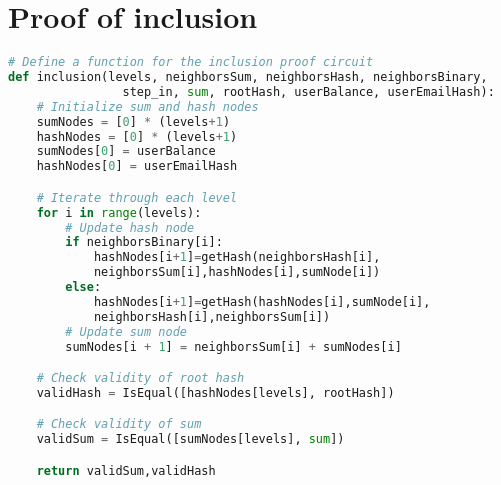 \section{Proof of inclusion}
\label{subsec:pic}
\begin{lstlisting}[language=Python, caption=Inclusion circuit pseudocode]
# Define a function for the inclusion proof circuit
def inclusion(levels, neighborsSum, neighborsHash, neighborsBinary, 
                step_in, sum, rootHash, userBalance, userEmailHash):
    # Initialize sum and hash nodes
    sumNodes = [0] * (levels+1)
    hashNodes = [0] * (levels+1)
    sumNodes[0] = userBalance
    hashNodes[0] = userEmailHash

    # Iterate through each level
    for i in range(levels):
        # Update hash node
        if neighborsBinary[i]:
            hashNodes[i+1]=getHash(neighborsHash[i],
            neighborsSum[i],hashNodes[i],sumNode[i])
        else:
            hashNodes[i+1]=getHash(hashNodes[i],sumNode[i],
            neighborsHash[i],neighborsSum[i])
        # Update sum node
        sumNodes[i + 1] = neighborsSum[i] + sumNodes[i]

    # Check validity of root hash
    validHash = IsEqual([hashNodes[levels], rootHash])

    # Check validity of sum
    validSum = IsEqual([sumNodes[levels], sum])

    return validSum,validHash
\end{lstlisting}

